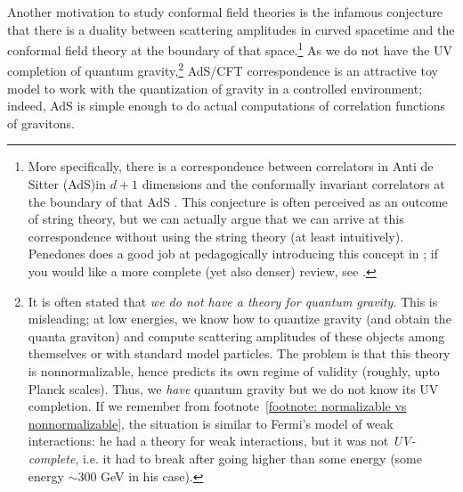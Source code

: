 \documentclass[12pt]{article}
\numberwithin{equation}{section}
\begin{document}
Another motivation to study conformal field theories is the infamous conjecture that there is a duality between scattering amplitudes in curved spacetime and the conformal field theory at the boundary of that space.\footnote{
More specifically, there is a correspondence between correlators in Anti de Sitter (AdS)\footnotemark in $d+1$ dimensions and the conformally invariant correlators at the boundary of that AdS \cite{Maldacena:1997re,Gubser:1998bc,Witten:1998qj}. This conjecture is often perceived as an outcome of string theory, but we can actually argue that we can arrive at this correspondence without using the string theory (at least intuitively). Penedones does a good job at pedagogically introducing this concept in \cite{Penedones:2016voo}; if you would like a more complete (yet also denser)  review, see \cite{Nastase:2007kj}.
}  As we do not have the UV completion of quantum gravity,\footnote{It is often stated that \emph{we do not have a theory for quantum gravity}. This is misleading; at low energies, we know how to quantize gravity (and obtain the quanta graviton) and compute scattering amplitudes of these objects among themselves or with standard model particles. The problem is that this theory is nonnormalizable, hence predicts its own regime of validity (roughly, upto Planck scales). Thus, we \emph{have} quantum gravity but we do not know its UV completion. If we remember from footnote~\ref{footnote: normalizable vs nonnormalizable}, the situation is similar to Fermi's model of weak interactions: he had a theory for weak interactions, but it was not \emph{UV-complete}, i.e. it had to break after going higher than some energy (some energy $\sim 300$ GeV in his case).} AdS/CFT correspondence is an attractive toy model to work with the quantization of gravity in a controlled environment; indeed, AdS is simple enough to do actual computations of correlation functions of gravitons.
\end{document}
